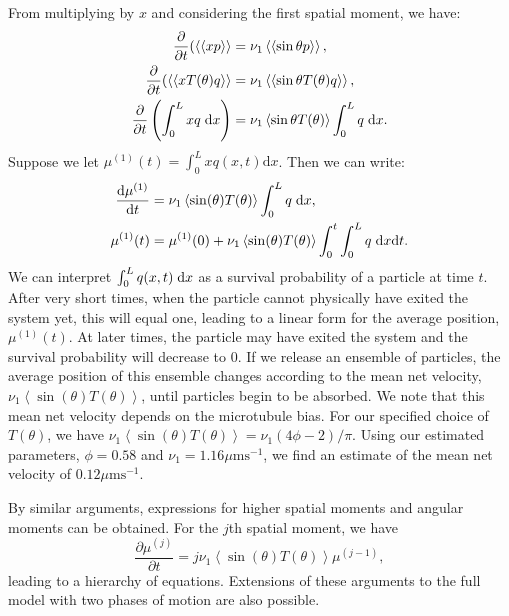 \documentclass[twocolumn]{biophys}
\def\mean#1{\left< #1 \right>}
\begin{document}
From multiplying by $x$ and considering the first spatial moment, we have:
\begin{align*}
 \frac{\partial}{\partial t} ( \mean{\mean{x p}} & = \nu_1 \mean{\mean{\sin{\theta} p}}, \\
 \frac{\partial}{\partial t} ( \mean{\mean{x T(\theta) q}} & = \nu_1 \mean{\mean{\sin{\theta} T(\theta) q}}, \\
 \frac{\partial}{\partial t} \left( \int_0^L x q \hspace{1mm} \text{d} x \right) & = \nu_1 \mean{\sin{\theta} T(\theta) } \int_0^L q \hspace{1mm} \text{d} x.
 \end{align*}
Suppose we let $\mu^{(1)}(t) = \int_0^L x q(x,t) \text{d} x  $. Then we can write:
\begin{align}
 \frac{\text{d} \mu^{(1)}}{\text{d} t} &= \nu_1 \mean{\sin(\theta) T(\theta)} \int_0^L q \hspace{1mm} \text{d} x, \nonumber \\
 \mu^{(1)}(t) &= \mu^{(1)}(0) + \nu_1 \mean{\sin(\theta) T(\theta)} \int_0^t \int_0^L q \hspace{1mm} \text{d} x \text{d} t.
\end{align}
We can interpret $\int_0^L q(x,t) \hspace{1mm} \text{d} x$ as a survival probability of a particle at time $t$.
After very short times, when the particle cannot physically have exited the system yet, this will equal one, leading to a linear form for the average position, $\mu^{(1)}(t)$. 
At later times, the particle may have exited the system and the survival probability will decrease to 0.
If we release an ensemble of particles, the average position of this ensemble changes according to the mean net velocity, $\nu_1 \mean{\sin(\theta) T(\theta)}$, until particles begin to be absorbed.
We note that this mean net velocity depends on the microtubule bias. 
For our specified choice of $T(\theta)$, we have $\nu_1 \mean{\sin(\theta) T(\theta)} = \nu_1 (4 \phi -2)/\pi$.
Using our estimated parameters, $\phi=0.58$ and $\nu_1 = 1.16 \mu \text{ms}^{-1}$, we find an estimate of the mean net velocity of $0.12 \mu \text{ms}^{-1}$.

By similar arguments, expressions for higher spatial moments and angular moments can be obtained.
For the $j$th spatial moment, we have
\begin{equation}
 \frac{\partial \mu^{(j)}}{\partial t} = j \nu_1 \mean{\sin(\theta) T(\theta)} \mu^{(j-1)}, 
\end{equation}
leading to a hierarchy of equations.
Extensions of these arguments to the full model with two phases of motion are also possible. 
\end{document}
